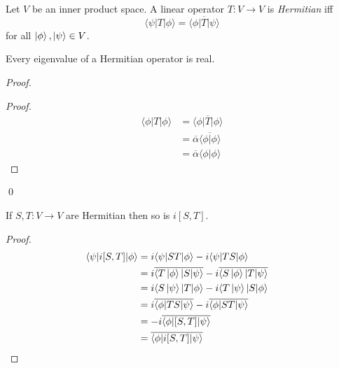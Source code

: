 \begin{df}[Hermitian]
Let $V$ be an inner product space. A linear operator $T : V \rightarrow V$ is \emph{Hermitian} iff
\[ \langle \psi | T | \phi \rangle = \overline{\langle \phi | T | \psi \rangle} \]
for all $\left| {\phi} \right\rangle, \left| {\psi} \right\rangle \in V$.
\end{df}

\begin{prop}
Every eigenvalue of a Hermitian operator is real.
\end{prop}

\begin{proof}
\pf
{}
\begin{proof}
	\pf
	\begin{align*}
		\langle \phi | T | \phi \rangle & = \overline{\langle \phi | T | \phi \rangle} \\
		& = \overline{\alpha} \overline{\langle \phi | \phi \rangle} \\
		& = \overline{\alpha} \langle \phi | \phi \rangle
	\end{align*}
\end{proof}
\qed
\end{proof}

\begin{prop}
If $S, T : V \rightarrow V$ are Hermitian then so is $i[S,T]$.
\end{prop}

\begin{proof}
\pf
\begin{align*}
	\langle \psi | i[S,T] | \phi \rangle
	& = i\langle \psi | ST | \phi \rangle - i\langle \psi | TS | \phi \rangle \\
	& = i \overline{\langle T \left| {\phi} \right\rangle | S | \psi \rangle} - i \overline{\langle S \left| {\phi} \right\rangle | T | \psi \rangle} \\
	& = i \langle S \left| {\psi} \right\rangle | T | \phi \rangle - i \langle T \left| {\psi} \right\rangle | S | \phi \rangle \\
	& = i \overline{\langle \phi | TS | \psi \rangle} -i \overline{\langle \phi | ST | \psi \rangle} \\
	& = -i \overline{\langle \phi | [S,T] | \psi \rangle} \\
	& = \overline{\langle \phi | i[S,T] | \psi \rangle} & \relax
\end{align*}
\end{proof}

